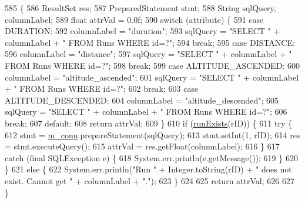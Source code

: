 \begin{DoxyCode}
585                                                                                    \{
586         ResultSet res;
587         PreparedStatement stmt;
588         String sqlQuery, columnLabel;
589         \textcolor{keywordtype}{float} attrVal = 0.0f;
590         \textcolor{keywordflow}{switch} (attribute) \{
591             \textcolor{keywordflow}{case} DURATION:
592                 columnLabel = \textcolor{stringliteral}{"duration"};
593                 sqlQuery = \textcolor{stringliteral}{"SELECT "} + columnLabel + \textcolor{stringliteral}{" FROM Runs WHERE id=?"};
594                 \textcolor{keywordflow}{break};
595             \textcolor{keywordflow}{case} DISTANCE:
596                 columnLabel = \textcolor{stringliteral}{"distance"};
597                 sqlQuery = \textcolor{stringliteral}{"SELECT "} + columnLabel + \textcolor{stringliteral}{" FROM Runs WHERE id=?"};
598                 \textcolor{keywordflow}{break};
599             \textcolor{keywordflow}{case} ALTITUDE\_ASCENDED:
600                 columnLabel = \textcolor{stringliteral}{"altitude\_ascended"};
601                 sqlQuery = \textcolor{stringliteral}{"SELECT "} + columnLabel + \textcolor{stringliteral}{" FROM Runs WHERE id=?"};
602                 \textcolor{keywordflow}{break};
603             \textcolor{keywordflow}{case} ALTITUDE\_DESCENDED:
604                 columnLabel = \textcolor{stringliteral}{"altitude\_descended"};
605                 sqlQuery = \textcolor{stringliteral}{"SELECT "} + columnLabel + \textcolor{stringliteral}{" FROM Runs WHERE id=?"};
606                 \textcolor{keywordflow}{break};
607             \textcolor{keywordflow}{default}:
608                 \textcolor{keywordflow}{return} attrVal;
609         \}
610         \textcolor{keywordflow}{if} (\mbox{\hyperlink{classcom_1_1activitytracker_1_1_d_b_manager_a723ac1c573bacdd0b62894357bd65a9b}{runExists}}(rID)) \{
611             \textcolor{keywordflow}{try} \{
612                 stmt = \mbox{\hyperlink{classcom_1_1activitytracker_1_1_d_b_manager_a064088d13ac09eb147fdc19268771521}{m\_conn}}.prepareStatement(sqlQuery);
613                 stmt.setInt(1, rID);
614                 res = stmt.executeQuery();
615                 attrVal = res.getFloat(columnLabel);
616             \}
617             \textcolor{keywordflow}{catch} (\textcolor{keyword}{final} SQLException e) \{
618                 System.err.println(e.getMessage());
619             \}
620         \}
621         \textcolor{keywordflow}{else} \{
622             System.err.println(\textcolor{stringliteral}{"Run "} + Integer.toString(rID) + \textcolor{stringliteral}{" does not exist. Cannot get "} + 
      columnLabel + \textcolor{stringliteral}{"."});
623         \}
624 
625         \textcolor{keywordflow}{return} attrVal;
626 
627     \}
\end{DoxyCode}

